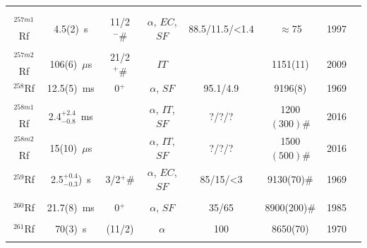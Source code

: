 \begin{center}
\begin{longtable}{c|ccccccl}
			&				&			&					&			& 				    &		&{\tiny\cite{Somerville1985,Hessberger1997,Hessberger1999,Holden2000,Dragojevic2008,Streicher2010}}\\
			&				&			&					&			& 				    &		&{\tiny\cite{Berryman2011,Rissanen2013,Hessberger2016,Mosat2020a,Hauschild2022}}\\
$^{257m1}$Rf& 4.5(2)~s		&  11/2$^-\#$&$\alpha$, $EC$, $SF$&88.5/11.5/<1.4& $\approx$75	&1997	&{\tiny\cite{Hessberger1997,Jeppesen2009,Qian2009,Berryman2010,Seweryniak2010,Streicher2010}}\\
			&				&			&					&			& 				    &		&{\tiny\cite{Herzberg2011,Rissanen2013,Hessberger2016,Mosat2020a,Hauschild2022}}\\
$^{257m2}$Rf& 106(6)~$\mu$s	&  21/2$^+ \#$&$IT$				&			& 1151(11) 		    &2009	&{\tiny\cite{Qian2009,Berryman2010,Rissanen2013}}\\
$^{258}$Rf	& 12.5(5)~ms	& 0$^+$		&$\alpha$, $SF$		&95.1/4.9	& 9196(8)		    &1969	&{\tiny\cite{Ghiorso1969,Oganessian1984,Hessberger1985a,Somerville1985,Hulet1994,Wild1994}}\\
			&				&			&					&			& 				    &		&{\tiny\cite{Gates2008,Lopez-Martens2019,Yeremin2019,Kuznetsova2020,Mosat2020}}\\
$^{258m1}$Rf& 2.4$^{+2.4}_{-0.8}$~ms&	&$\alpha$, $IT$, $SF$&?/?/?	    & 1200$(300)\#$	    &2016	&{\tiny\cite{Hessberger2016a}}\\
$^{258m2}$Rf& 15(10)~$\mu$s	& 		    &$\alpha$, $IT$, $SF$&?/?/?	    & 1500$(500)\#$	    &2016	&{\tiny\cite{Hessberger2016a}}\\
$^{259}$Rf	& 2.5$^{+0.4}_{-0.3}$)~s&3/2$^+ \#$&$\alpha$, $EC$, $SF$&85/15/<3&9130(70)$\#$	&1969	&{\tiny\cite{Ghiorso1969,Ghiorso1971,Druin1973,Ghiorso1974,Bemis1981,Somerville1985}}\\
			&				&			&					&			& 				    &		&{\tiny\cite{Gregorich1994,Lazarev2000,Folden2004,Morita2004,Gregorich2006,Gates2008}}\\
$^{260}$Rf	& 21.7(8)~ms	& 0$^+$		&$\alpha$, $SF$	   &35/65	    &8900(200)$\#$	    &1985	&{\tiny\cite{Flerov1964,Oganessian1970,Druin1976,Bemis1977,Druin1977,Nitschke1981}}\\
			&				&			&					&			& 				    &		&{\tiny\cite{Somerville1985,Hulet1989,Hoffman1995}}\\
$^{261}$Rf	& 70(3)~s		& (11/2)	&$\alpha$			&100 		&8650(70)		    &1970	&{\tiny\cite{Ghiorso1970,Lougheed1994,Kadkhodayan1996,Hofmann1996,Schaedel1997,Tuerler1998}}\\
			&				&			&					&			& 				    &		&{\tiny\cite{Lazarev2000,Sylwester2000,Huebener2001,Hofmann2002,Tuerler2003,Zweidorf2004}}\\

\end{longtable}
\end{center}
